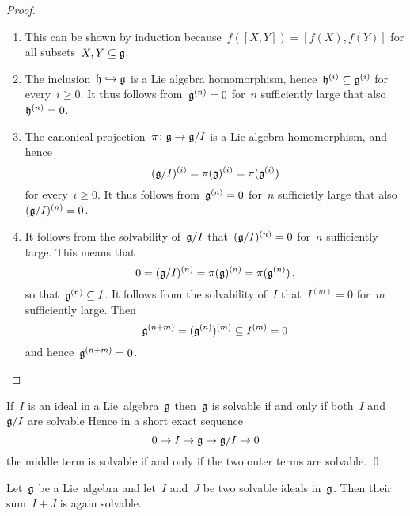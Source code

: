 \begin{proof}
  \leavevmode
  \begin{enumerate}
    \item
      This can be shown by induction because~$f([X,Y]) = [f(X), f(Y)]$ for all subsets~$X, Y \subseteq \mathfrak{g}$.
    \item
      The inclusion~$\mathfrak{h} \hookrightarrow \mathfrak{g}$ is a Lie algebra homomorphism, hence~$\mathfrak{h}^{(i)} \subseteq \mathfrak{g}^{(i)}$ for every~$i \geq 0$.
      It thus follows from~$\mathfrak{g}^{(n)} = 0$ for~$n$ sufficiently large that also~$\mathfrak{h}^{(n)} = 0$.
    \item
      The canonical projection~$\pi \colon \mathfrak{g} \to \mathfrak{g}/I$ is a Lie algebra homomorphism, and hence
      \[
        (\mathfrak{g}/I)^{(i)}
        =
        \pi(\mathfrak{g})^{(i)}
        =
        \pi(\mathfrak{g}^{(i)})
      \]
      for every~$i \geq 0$.
      It thus follows from~$\mathfrak{g}^{(n)} = 0$ for~$n$ sufficietly large that also~$(\mathfrak{g}/I)^{(n)} = 0$.
    \item
      It follows from the solvability of~$\mathfrak{g}/I$ that~$(\mathfrak{g}/I)^{(n)} = 0$ for~$n$ sufficiently large.
      This means that
      \[
        0
        =
        (\mathfrak{g}/I)^{(n)}
        =
        \pi(\mathfrak{g})^{(n)}
        =
        \pi(\mathfrak{g}^{(n)})  \,,
      \]
      so that~$\mathfrak{g}^{(n)} \subseteq I$.
      It follows from the solvability of~$I$ that~$I^{(m)} = 0$ for~$m$ sufficiently large.
      Then
      \[
        \mathfrak{g}^{(n+m)}
        =
        (\mathfrak{g}^{(n)})^{(m)}
        \subseteq
        I^{(m)}
        =
        0
      \]
      and hence~$\mathfrak{g}^{(n+m)} = 0$.
    \qedhere
  \end{enumerate}
\end{proof}


\begin{corollary}
  \label{solvable via ses}
  If~$I$ is an ideal in a Lie~algebra~$\mathfrak{g}$ then~$\mathfrak{g}$ is solvable if and only if both~$I$ and~$\mathfrak{g}/I$ are solvable
  Hence in a short exact sequence
  \[
    0
    \to
    I
    \to
    \mathfrak{g}
    \to
    \mathfrak{g}/I
    \to
    0
  \]
  the middle term is solvable if and only if the two outer terms are solvable.
  \qed
\end{corollary}


\begin{corollary}
  \label{sum of solvable ideals is solvable}
  Let~$\mathfrak{g}$ be a Lie~algebra and let~$I$ and~$J$ be two solvable ideals in~$\mathfrak{g}$.
  Then their sum~$I + J$ is again solvable.
\end{corollary}


